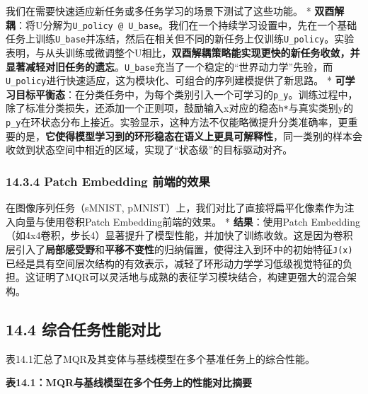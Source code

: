 \documentclass[
  12pt,
]{article}
\begin{document}
我们在需要快速适应新任务或多任务学习的场景下测试了这些功能。 *
\textbf{双酉解耦}：将U分解为\texttt{U\_policy\ @\ U\_base}。我们在一个持续学习设置中，先在一个基础任务上训练\texttt{U\_base}并冻结，然后在相关但不同的新任务上仅训练\texttt{U\_policy}。实验表明，与从头训练或微调整个U相比，\textbf{双酉解耦策略能实现更快的新任务收敛，并显著减轻对旧任务的遗忘}。\texttt{U\_base}充当了一个稳定的``世界动力学''先验，而\texttt{U\_policy}进行快速适应，这为模块化、可组合的序列建模提供了新思路。
*
\textbf{可学习目标平衡态}：在分类任务中，为每个类别引入一个可学习的\texttt{p\_y}。训练过程中，除了标准分类损失，还添加一个正则项，鼓励输入x对应的稳态\texttt{h*}与真实类别y的\texttt{p\_y}在环状态分布上接近。实验显示，这种方法不仅能略微提升分类准确率，更重要的是，\textbf{它使得模型学习到的环形稳态在语义上更具可解释性}，同一类别的样本会收敛到状态空间中相近的区域，实现了``状态级''的目标驱动对齐。

\hypertarget{patch-embedding-ux524dux7aefux7684ux6548ux679c}{%
\subsubsection{14.3.4 Patch Embedding
前端的效果}\label{patch-embedding-ux524dux7aefux7684ux6548ux679c}}

在图像序列任务（sMNIST,
pMNIST）上，我们对比了直接将扁平化像素作为注入向量与使用卷积Patch
Embedding前端的效果。 * \textbf{结果}：使用Patch
Embedding（如4x4卷积，步长4）显著提升了模型性能，并加快了训练收敛。这是因为卷积层引入了\textbf{局部感受野}和\textbf{平移不变性}的归纳偏置，使得注入到环中的初始特征\texttt{J(x)}已经是具有空间层次结构的有效表示，减轻了环形动力学学习低级视觉特征的负担。这证明了MQR可以灵活地与成熟的表征学习模块结合，构建更强大的混合架构。

\hypertarget{ux7efcux5408ux4efbux52a1ux6027ux80fdux5bf9ux6bd4}{%
\subsection{14.4
综合任务性能对比}\label{ux7efcux5408ux4efbux52a1ux6027ux80fdux5bf9ux6bd4}}

表14.1汇总了MQR及其变体与基线模型在多个基准任务上的综合性能。

\textbf{表14.1：MQR与基线模型在多个任务上的性能对比摘要}
\end{document}
